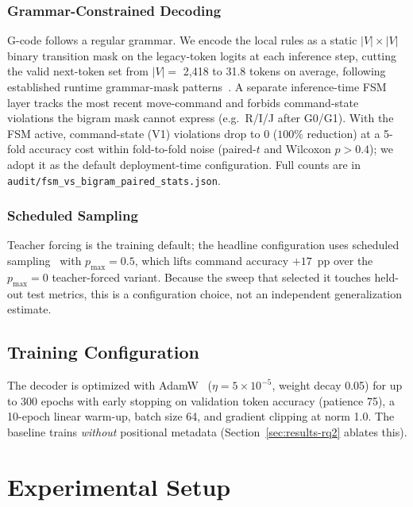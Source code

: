 \documentclass[conference]{IEEEtran}
\begin{document}
\subsubsection{Grammar-Constrained Decoding}
\label{sec:grammar}

G-code follows a regular grammar. We encode the local rules as a static $|V| \times |V|$ binary transition mask on the legacy-token logits at each inference step, cutting the valid next-token set from $|V|=$ 2{,}418 to 31.8 tokens on average, following established runtime grammar-mask patterns~\cite{picard,outlines,xgrammar,geng2023gcd}. A separate inference-time FSM layer tracks the most recent move-command and forbids command-state violations the bigram mask cannot express (e.g.\ R/I/J after G0/G1). With the FSM active, command-state (V1) violations drop to $0$ ($100\%$ reduction) at a 5-fold accuracy cost within fold-to-fold noise (paired-$t$ and Wilcoxon $p>0.4$); we adopt it as the default deployment-time configuration. Full counts are in \texttt{audit/fsm\_vs\_bigram\_paired\_stats.json}.

\subsubsection{Scheduled Sampling}
\label{sec:scheduled-sampling}

Teacher forcing is the training default; the headline configuration uses scheduled sampling~\cite{scheduled_sampling} with $p_{\text{max}}=0.5$, which lifts command accuracy $+17$~pp over the $p_{\text{max}}=0$ teacher-forced variant. Because the sweep that selected it touches held-out test metrics, this is a configuration choice, not an independent generalization estimate.

\subsection{Training Configuration}
\label{sec:training}

The decoder is optimized with AdamW~\cite{loshchilov2019adamw} ($\eta = 5 \times 10^{-5}$, weight decay 0.05) for up to 300 epochs with early stopping on validation token accuracy (patience 75), a 10-epoch linear warm-up, batch size 64, and gradient clipping at norm 1.0. The baseline trains \emph{without} positional metadata (Section~\ref{sec:results-rq2} ablates this).
\section{Experimental Setup}
\label{sec:setup}
\end{document}
